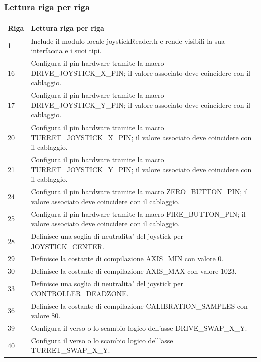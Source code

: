 \documentclass[11pt,a4paper]{article}
\begin{document}
\subsubsection{Lettura riga per riga}
\begin{longtable}{p{}p{}}
\toprule
\textbf{Riga} & \textbf{Lettura riga per riga} \\
\midrule
\endhead
1 & Include il modulo locale joystickReader.h e rende visibili la sua interfaccia e i suoi tipi. \\
16 & Configura il pin hardware tramite la macro DRIVE\_\allowbreak{}JOYSTICK\_\allowbreak{}X\_\allowbreak{}PIN; il valore associato deve coincidere con il cablaggio. \\
17 & Configura il pin hardware tramite la macro DRIVE\_\allowbreak{}JOYSTICK\_\allowbreak{}Y\_\allowbreak{}PIN; il valore associato deve coincidere con il cablaggio. \\
20 & Configura il pin hardware tramite la macro TURRET\_\allowbreak{}JOYSTICK\_\allowbreak{}X\_\allowbreak{}PIN; il valore associato deve coincidere con il cablaggio. \\
21 & Configura il pin hardware tramite la macro TURRET\_\allowbreak{}JOYSTICK\_\allowbreak{}Y\_\allowbreak{}PIN; il valore associato deve coincidere con il cablaggio. \\
24 & Configura il pin hardware tramite la macro ZERO\_\allowbreak{}BUTTON\_\allowbreak{}PIN; il valore associato deve coincidere con il cablaggio. \\
25 & Configura il pin hardware tramite la macro FIRE\_\allowbreak{}BUTTON\_\allowbreak{}PIN; il valore associato deve coincidere con il cablaggio. \\
28 & Definisce una soglia di neutralita' del joystick per JOYSTICK\_\allowbreak{}CENTER. \\
29 & Definisce la costante di compilazione AXIS\_\allowbreak{}MIN con valore 0. \\
30 & Definisce la costante di compilazione AXIS\_\allowbreak{}MAX con valore 1023. \\
33 & Definisce una soglia di neutralita' del joystick per CONTROLLER\_\allowbreak{}DEADZONE. \\
36 & Definisce la costante di compilazione CALIBRATION\_\allowbreak{}SAMPLES con valore 80. \\
39 & Configura il verso o lo scambio logico dell'asse DRIVE\_\allowbreak{}SWAP\_\allowbreak{}X\_\allowbreak{}Y. \\
40 & Configura il verso o lo scambio logico dell'asse TURRET\_\allowbreak{}SWAP\_\allowbreak{}X\_\allowbreak{}Y. \\

\end{longtable}
\end{document}
